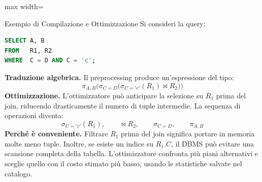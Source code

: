 \documentclass[12pt]{extarticle}
\begin{document}
\begin{center}
\begin{adjustbox}{max width=\linewidth}
\end{adjustbox}
\end{center}

\begin{cbox}{Esempio di Compilazione e Ottimizzazione}
\noindent Si consideri la query:
\begin{lstlisting}[language=SQL]
SELECT A, B
FROM   R1, R2
WHERE  C = D AND C = 'c';
\end{lstlisting}
\medskip
\noindent \textbf{Traduzione algebrica.} Il preprocessing produce un'espressione del tipo:
\[
\pi_{A,B}\Big(\sigma_{C=D}\big(\sigma_{C='c'}(R_1) \bowtie R_2\big)\Big)
\]
\medskip
\noindent \textbf{Ottimizzazione.} L'ottimizzatore può anticipare la selezione su $R_1$ prima del join, riducendo drasticamente il numero di tuple intermedie. La sequenza di operazioni diventa:
\[
\sigma_{C='c'}(R_1), \qquad \bowtie R_2, \qquad \sigma_{C=D}, \qquad \pi_{A,B}
\]
\medskip
\noindent \textbf{Perché è conveniente.} Filtrare $R_1$ prima del join significa portare in memoria molte meno tuple. Inoltre, se esiste un indice su $R_1.C$, il DBMS può evitare una scansione completa della tabella. L'ottimizzatore confronta più piani alternativi e sceglie quello con il costo stimato più basso, usando le statistiche salvate nel catalogo.
\end{cbox}
\end{document}
